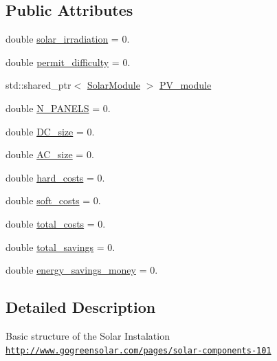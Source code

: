 \subsection*{Public Attributes}
\begin{DoxyCompactItemize}
\item 
double \hyperlink{classsolar__core_1_1_p_v_design_ae74d98b592c49c7bb44a2e2ec07093c4}{solar\+\_\+irradiation} = 0.
\item 
double \hyperlink{classsolar__core_1_1_p_v_design_a8c2897033c697a6dcfb96787358dc64f}{permit\+\_\+difficulty} = 0.
\item 
std\+::shared\+\_\+ptr$<$ \hyperlink{classsolar__core_1_1_solar_module}{Solar\+Module} $>$ \hyperlink{classsolar__core_1_1_p_v_design_a89f2b59847de64cab26b56f21ace4e6c}{P\+V\+\_\+module}
\item 
double \hyperlink{classsolar__core_1_1_p_v_design_abef277ad010afb4ab6c6c13113a8c017}{N\+\_\+\+P\+A\+N\+E\+L\+S} = 0.
\item 
double \hyperlink{classsolar__core_1_1_p_v_design_a21148518ef58004be10b91dc75fdd5b5}{D\+C\+\_\+size} = 0.
\item 
double \hyperlink{classsolar__core_1_1_p_v_design_a79a70e7fe3adcbc4e9256db9df38e444}{A\+C\+\_\+size} = 0.
\item 
double \hyperlink{classsolar__core_1_1_p_v_design_a18cec349cd8f04efcb67562e30416860}{hard\+\_\+costs} = 0.
\item 
double \hyperlink{classsolar__core_1_1_p_v_design_ac1220011d65d7cc442cd143f93123f31}{soft\+\_\+costs} = 0.
\item 
double \hyperlink{classsolar__core_1_1_p_v_design_ac015f1cf090279e45861f2860f008cc2}{total\+\_\+costs} = 0.
\item 
double \hyperlink{classsolar__core_1_1_p_v_design_a7628fe2e1ea95f8df79aca11dd5a356d}{total\+\_\+savings} = 0.
\item 
double \hyperlink{classsolar__core_1_1_p_v_design_a6b777b1d9dbd1f5a06b8d67d5204340b}{energy\+\_\+savings\+\_\+money} = 0.
\end{DoxyCompactItemize}


\subsection{Detailed Description}
Basic structure of the Solar Instalation \href{http://www.gogreensolar.com/pages/solar-components-101}{\tt http\+://www.\+gogreensolar.\+com/pages/solar-\/components-\/101} 

